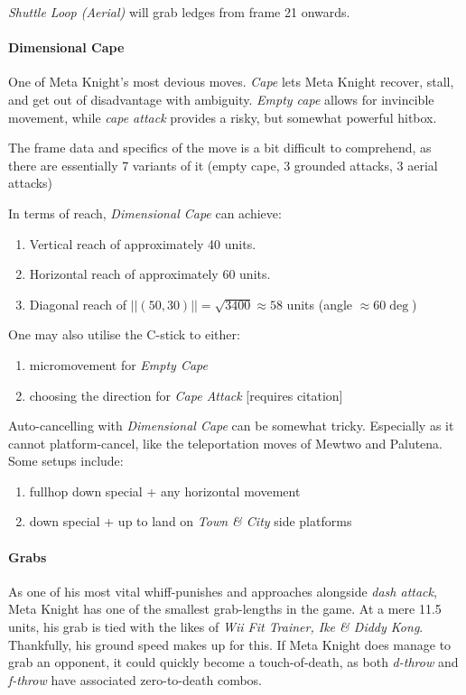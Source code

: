 \textit{Shuttle Loop (Aerial)} will grab ledges from frame 21 onwards.
\paragraph[Down Special]{Dimensional Cape}
One of Meta Knight's most devious moves. \textit{Cape} lets Meta Knight recover, stall, and get out of disadvantage with ambiguity. \textit{Empty cape} allows for invincible movement, while \textit{cape attack} provides a risky, but somewhat powerful hitbox.

The frame data and specifics of the move is a bit difficult to comprehend, as there are essentially 7 variants of it (empty cape, 3 grounded attacks, 3 aerial attacks)

In terms of reach, \textit{Dimensional Cape} can achieve:
\begin{enumerate}[label = \roman*.]
	\item Vertical reach of approximately 40 units.
	\item Horizontal reach of approximately 60 units.
	\item Diagonal reach of $||(50, 30)|| = \sqrt{3400} \approx 58$ units (angle $\approx 60\deg$)
\end{enumerate}
One may also utilise the C-stick to either:
\begin{enumerate}[label = \roman*.]
	\item micromovement for \textit{Empty Cape}
	\item choosing the direction for \textit{Cape Attack} [requires citation] %
\end{enumerate}

Auto-cancelling with \textit{Dimensional Cape} can be somewhat tricky. Especially as it cannot platform-cancel, like the teleportation moves of Mewtwo and Palutena. 
Some setups include:
\begin{enumerate}[label = \roman*.]
	\item fullhop down special + any horizontal movement
	\item down special + up to land on \textit{Town \& City} side platforms
\end{enumerate}

\paragraph{Grabs}
As one of his most vital whiff-punishes and approaches alongside \textit{dash attack}, Meta Knight has one of the smallest grab-lengths in the game. At a mere 11.5 units, his grab is tied with the likes of \textit{Wii Fit Trainer, Ike \& Diddy Kong}. Thankfully, his ground speed makes up for this. If Meta Knight does manage to grab an opponent, it could quickly become a touch-of-death, as both \textit{d-throw} and \textit{f-throw} have associated zero-to-death combos.
